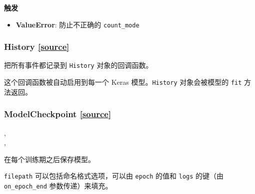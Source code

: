 \textbf{触发}

\begin{itemize}
\tightlist
\item
  \textbf{ValueError}: 防止不正确的 \texttt{count\_mode}
\end{itemize}




\subsubsection{History {\href{https://github.com/keras-team/keras/blob/master/keras/callbacks.py\#L313}{{[}source{]}}}}

\begin{Shaded}
\begin{Highlighting}[]
\end{Highlighting}
\end{Shaded}

把所有事件都记录到 \texttt{History} 对象的回调函数。

这个回调函数被自动启用到每一个 Keras 模型。\texttt{History}
对象会被模型的 \texttt{fit} 方法返回。




\subsubsection{ModelCheckpoint {\href{https://github.com/keras-team/keras/blob/master/keras/callbacks.py\#L332}{{[}source{]}}}}

\begin{Shaded}
\begin{Highlighting}[]
\OperatorTok{=}\OperatorTok{=}, \\
\hspace{3cm}\OperatorTok{=}\OperatorTok{=}, \\
\hspace{3cm}\OperatorTok{=}\OperatorTok{=}\NormalTok{)}
\end{Highlighting}
\end{Shaded}

在每个训练期之后保存模型。

\texttt{filepath} 可以包括命名格式选项，可以由 \texttt{epoch} 的值和
\texttt{logs} 的键（由 \texttt{on\_epoch\_end} 参数传递）来填充。

